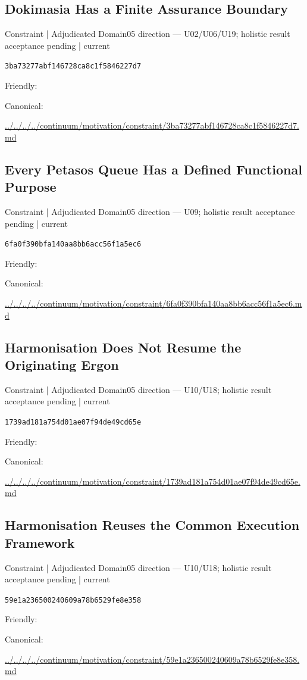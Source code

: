 \documentclass[10pt,a4paper]{article}
\begin{document}
\subsection*{Dokimasia Has a Finite Assurance Boundary}
{\small Constraint | Adjudicated Domain05 direction — U02/U06/U19; holistic result acceptance pending | current}\par
\texttt{3ba73277abf146728ca8c1f5846227d7}\par
Friendly: \par
Canonical: \par
{\footnotesize\url{../../../../continuum/motivation/constraint/3ba73277abf146728ca8c1f5846227d7.md}}\par
\subsection*{Every Petasos Queue Has a Defined Functional Purpose}
{\small Constraint | Adjudicated Domain05 direction — U09; holistic result acceptance pending | current}\par
\texttt{6fa0f390bfa140aa8bb6acc56f1a5ec6}\par
Friendly: \par
Canonical: \par
{\footnotesize\url{../../../../continuum/motivation/constraint/6fa0f390bfa140aa8bb6acc56f1a5ec6.md}}\par
\subsection*{Harmonisation Does Not Resume the Originating Ergon}
{\small Constraint | Adjudicated Domain05 direction — U10/U18; holistic result acceptance pending | current}\par
\texttt{1739ad181a754d01ae07f94de49cd65e}\par
Friendly: \par
Canonical: \par
{\footnotesize\url{../../../../continuum/motivation/constraint/1739ad181a754d01ae07f94de49cd65e.md}}\par
\subsection*{Harmonisation Reuses the Common Execution Framework}
{\small Constraint | Adjudicated Domain05 direction — U10/U18; holistic result acceptance pending | current}\par
\texttt{59e1a236500240609a78b6529fe8e358}\par
Friendly: \par
Canonical: \par
{\footnotesize\url{../../../../continuum/motivation/constraint/59e1a236500240609a78b6529fe8e358.md}}\par
\end{document}
